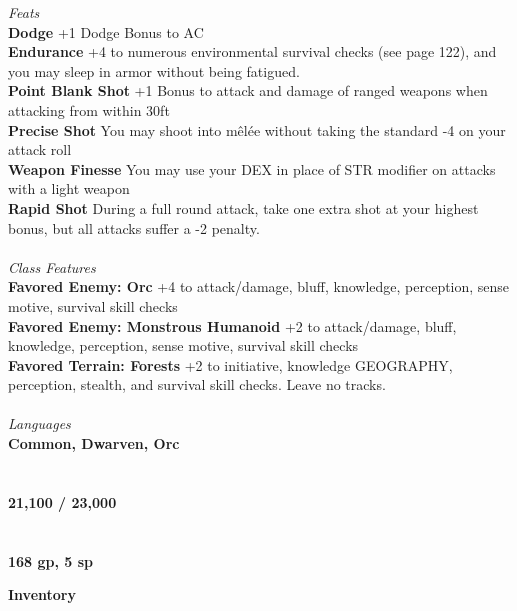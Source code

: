 \documentclass[letterpaper]{article}
\begin{document}
\noindent\emph{Feats} \\
\noindent\textbf{Dodge} +1 Dodge Bonus to AC \\
\noindent\textbf{Endurance} +4 to numerous environmental survival checks (see page 122), and you may sleep in armor without being fatigued.\\
\noindent\textbf{Point Blank Shot} +1 Bonus to attack and damage of ranged weapons when attacking from within 30ft \\
\noindent\textbf{Precise Shot} You may shoot into m\^{e}l\'{e}e without taking the standard -4 on your attack roll \\
\noindent\textbf{Weapon Finesse} You may use your DEX in place of STR modifier on attacks with a light weapon \\
\noindent\textbf{Rapid Shot} During a full round attack, take one extra shot at your highest bonus, but all attacks suffer a -2 penalty.\\
\\
\noindent\emph{Class Features} \\
\textbf{Favored Enemy: Orc} +4 to attack/damage, bluff, knowledge, perception, sense motive, survival skill checks \\
\textbf{Favored Enemy: Monstrous Humanoid} +2 to attack/damage, bluff, knowledge, perception, sense motive, survival skill checks \\
\textbf{Favored Terrain: Forests} +2 to initiative, knowledge {\scriptsize GEOGRAPHY}, perception, stealth, and survival skill checks.  Leave no tracks. \\
\\
\noindent\emph{Languages} \\
\textbf{Common, Dwarven, Orc} \\
\\
 \\
\textbf{21,100 / 23,000} \\
\\
 \\
\textbf{168 gp, 5 sp} \\

\pagebreak

\noindent \textbf{\huge{Inventory}} \\
\end{document}
